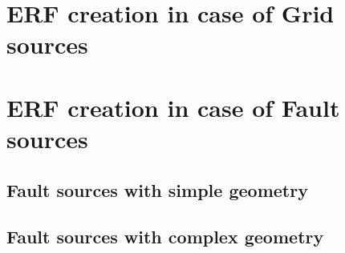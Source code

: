 \section{ERF creation in case of Grid sources}

%
\section{ERF creation in case of Fault sources}

%
\subsection{Fault sources with simple geometry}

%
\subsection{Fault sources with complex geometry}

